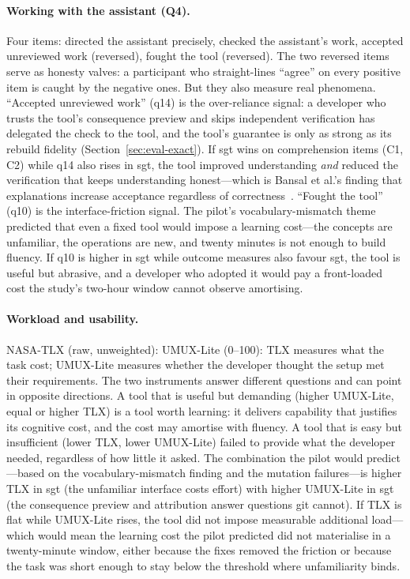 \paragraph{Working with the assistant (Q4).}
Four items: directed the assistant precisely, checked the assistant's work,
accepted unreviewed work (reversed), fought the tool (reversed). The two
reversed items serve as honesty valves: a participant who straight-lines
``agree'' on every positive item is caught by the negative ones. But they also
measure real phenomena. ``Accepted unreviewed work'' (q14) is the
over-reliance signal: a developer who trusts the tool's consequence preview
and skips independent verification has delegated the check to the tool, and the
tool's guarantee is only as strong as its rebuild fidelity (Section~\ref{sec:eval-exact}).
If sgt wins on comprehension items (C1, C2) while q14 also rises in sgt, the
tool improved understanding \emph{and} reduced the verification that keeps
understanding honest---which is Bansal et al.'s finding that explanations
increase acceptance regardless of correctness~\cite{bansal2021}.
``Fought the tool'' (q10) is the interface-friction signal. The pilot's
vocabulary-mismatch theme predicted that even a fixed tool would impose a
learning cost---the concepts are unfamiliar, the operations are new, and twenty
minutes is not enough to build fluency. If q10 is higher in sgt while outcome
measures also favour sgt, the tool is useful but abrasive, and a developer who
adopted it would pay a front-loaded cost the study's two-hour window cannot
observe amortising.

\paragraph{Workload and usability.}
NASA-TLX (raw, unweighted): 
UMUX-Lite (0--100): 
TLX measures what the task cost; UMUX-Lite measures whether the developer
thought the setup met their requirements. The two instruments answer different
questions and can point in opposite directions. A tool that is useful but
demanding (higher UMUX-Lite, equal or higher TLX) is a tool worth learning: it
delivers capability that justifies its cognitive cost, and the cost may
amortise with fluency. A tool that is easy but insufficient (lower TLX, lower
UMUX-Lite) failed to provide what the developer needed, regardless of how
little it asked. The combination the pilot would predict---based on the
vocabulary-mismatch finding and the mutation failures---is higher TLX in sgt
(the unfamiliar interface costs effort) with higher UMUX-Lite in sgt (the
consequence preview and attribution answer questions git cannot). If TLX is
flat while UMUX-Lite rises, the tool did not impose measurable additional
load---which would mean the learning cost the pilot predicted did not
materialise in a twenty-minute window, either because the fixes removed the
friction or because the task was short enough to stay below the threshold where
unfamiliarity binds.

